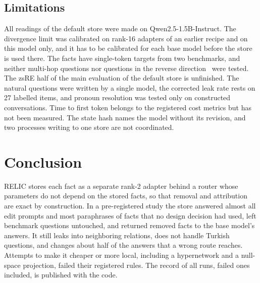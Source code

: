 \documentclass[journal,10pt]{IEEEtran}
\begin{document}
\subsection{Limitations}
All readings of the default store were made on Qwen2.5-1.5B-Instruct. The divergence limit was calibrated on
rank-16 adapters of an earlier recipe and on this model only, and it has to be calibrated for each base model before
the store is used there. The facts have single-token targets from two benchmarks, and neither multi-hop questions
nor questions in the reverse direction~\cite{berglund2024reversal} were tested. The zsRE half of the main
evaluation of the default store is unfinished. The natural questions were written by a single model, the
corrected leak rate rests on 27 labelled items, and pronoun resolution was tested only on constructed
conversations. Time to first token belongs to the registered cost metrics but has not been measured. The state
hash names the model without its revision, and two processes writing to one store are not coordinated.

\section{Conclusion}
RELIC stores each fact as a separate rank-2 adapter behind a router whose parameters do not depend on the stored
facts, so that removal and attribution are exact by construction. In a pre-registered study the store answered
almost all edit prompts and most paraphrases of facts that no design decision had used, left benchmark questions
untouched, and returned removed facts to the base model's answers. It still leaks into neighboring relations,
does not handle Turkish questions, and changes about half of the answers that a wrong route reaches. Attempts to
make it cheaper or more local, including a hypernetwork and a null-space projection, failed their registered
rules. The record of all runs, failed ones included, is published with the code.

\appendix
\end{document}
